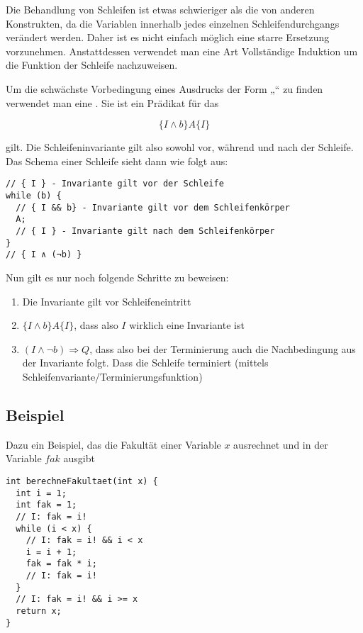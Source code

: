 \documentclass{lehramt-informatik-haupt}
\begin{document}
Die Behandlung von Schleifen ist etwas schwieriger als die von anderen
Konstrukten, da die Variablen innerhalb jedes einzelnen
Schleifendurchgangs verändert werden. Daher ist es nicht einfach möglich
eine starre Ersetzung vorzunehmen. Anstattdessen verwendet man eine Art
Vollständige Induktion um die Funktion der Schleife nachzuweisen.

Um die schwächste Vorbedingung eines Ausdrucks der Form „“ zu finden verwendet man eine . Sie
ist ein Prädikat für das

\begin{displaymath}
\{ I \wedge b \} A \{ I \}
\end{displaymath}

\noindent
gilt. Die Schleifeninvariante gilt also sowohl vor, während und nach der
Schleife. Das Schema einer Schleife sieht dann wie folgt aus:

\begin{verbatim}
// { I } - Invariante gilt vor der Schleife
while (b) {
  // { I && b} - Invariante gilt vor dem Schleifenkörper
  A;
  // { I } - Invariante gilt nach dem Schleifenkörper
}
// { I ∧ (¬b) }
\end{verbatim}

Nun gilt es nur noch folgende Schritte zu beweisen:

\begin{enumerate}
\item Die Invariante gilt vor Schleifeneintritt

\item $\{ I \wedge b \} A \{ I \}$, dass also $I$ wirklich eine
Invariante ist

\item $(I \wedge \neg b) \Rightarrow Q$, dass also bei der Terminierung
auch die Nachbedingung aus der Invariante folgt. Dass die Schleife
terminiert (mittels Schleifenvariante/Terminierungsfunktion)
\end{enumerate}

\subsection{Beispiel}

Dazu ein Beispiel, das die Fakultät einer Variable $x$ ausrechnet und in
der Variable $fak$ ausgibt

\begin{verbatim}
int berechneFakultaet(int x) {
  int i = 1;
  int fak = 1;
  // I: fak = i!
  while (i < x) {
    // I: fak = i! && i < x
    i = i + 1;
    fak = fak * i;
    // I: fak = i!
  }
  // I: fak = i! && i >= x
  return x;
}
\end{verbatim}
\end{document}
